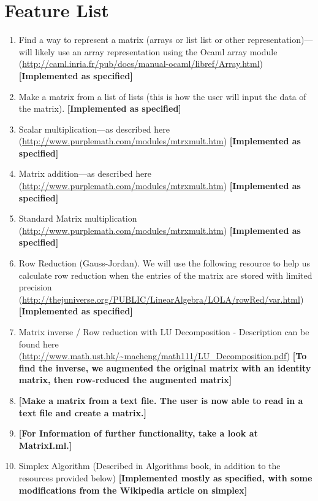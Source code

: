 \documentclass[letterpaper,11pt]{article}
\newcommand{\annot}[1]{\textbf{\color{BrickRed} [#1]}}
\begin{document}
\section{Feature List}
\begin{enumerate}

\item Find a way to represent a matrix (arrays or list list or other
representation)---will likely use an array representation using the Ocaml array
module (\url{http://caml.inria.fr/pub/docs/manual-ocaml/libref/Array.html})
{\annot{Implemented as specified}}

\item Make a matrix from a list of lists (this is how the user will input the
data of the matrix). {\annot{Implemented as specified}}

\item Scalar multiplication---as described here
(\url{http://www.purplemath.com/modules/mtrxmult.htm})
{\annot{Implemented as specified}}

\item Matrix addition---as described here
(\url{http://www.purplemath.com/modules/mtrxmult.htm})
{\annot{Implemented as specified}}

\item Standard Matrix multiplication
(\url{http://www.purplemath.com/modules/mtrxmult.htm}) 
{\annot{Implemented as specified}}

\item Row Reduction (Gauss-Jordan). We will use the following resource to help
us calculate row reduction when the entries of the matrix are stored with
limited precision
(\url{http://thejuniverse.org/PUBLIC/LinearAlgebra/LOLA/rowRed/var.html})
{\annot{Implemented as specified}}

\item Matrix inverse / Row reduction with LU Decomposition - Description can be
found here (\url{http://www.math.ust.hk/~macheng/math111/LU_Decomposition.pdf})
{\annot{To find the inverse, we augmented the original matrix with an identity
matrix, then row-reduced the augmented matrix}}

\item{\annot{Make a matrix from a text file. The user is now able to read in a
text file and create a matrix.}}

\item{\annot{For Information of further functionality, take a look at MatrixI.ml.}}

\item Simplex Algorithm (Described in Algorithms book, in addition to the
resources provided below)
{\annot{Implemented mostly as specified, with some modifications from the
Wikipedia article on simplex}}


\end{enumerate}
\end{document}
